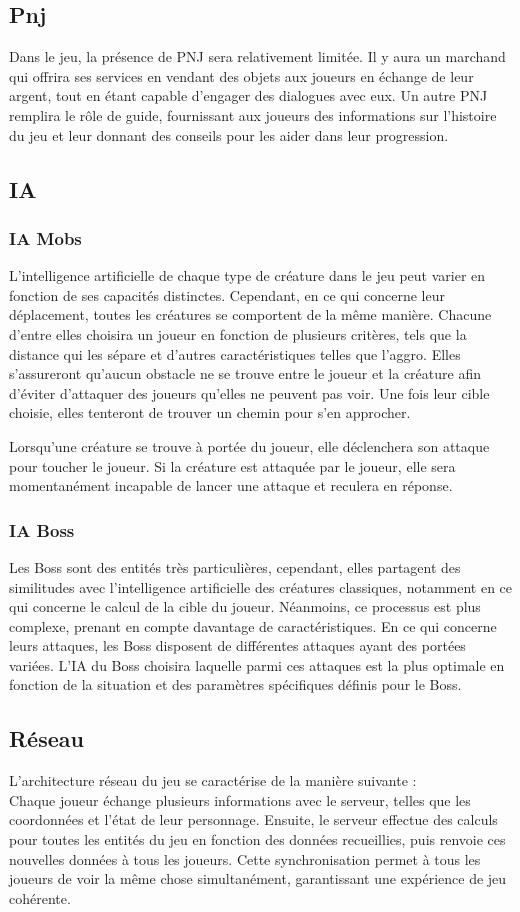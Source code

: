 \documentclass{article}
\begin{document}
\subsection{Pnj}
Dans le jeu, la présence de PNJ sera relativement limitée. Il y aura un marchand qui offrira ses services en vendant des objets aux joueurs en échange de leur argent, tout en étant capable d'engager des dialogues avec eux. Un autre PNJ remplira le rôle de guide, fournissant aux joueurs des informations sur l'histoire du jeu et leur donnant des conseils pour les aider dans leur progression.
\subsection{IA}
\subsubsection{IA Mobs}
L'intelligence artificielle de chaque type de créature dans le jeu peut varier en fonction de ses capacités distinctes. Cependant, en ce qui concerne leur déplacement, toutes les créatures se comportent de la même manière. Chacune d'entre elles choisira un joueur en fonction de plusieurs critères, tels que la distance qui les sépare et d'autres caractéristiques telles que l'aggro. Elles s'assureront qu'aucun obstacle ne se trouve entre le joueur et la créature afin d'éviter d'attaquer des joueurs qu'elles ne peuvent pas voir. Une fois leur cible choisie, elles tenteront de trouver un chemin pour s'en approcher.

Lorsqu'une créature se trouve à portée du joueur, elle déclenchera son attaque pour toucher le joueur. Si la créature est attaquée par le joueur, elle sera momentanément incapable de lancer une attaque et reculera en réponse.
\subsubsection{IA Boss}
Les Boss sont des entités très particulières, cependant, elles partagent des similitudes avec l'intelligence artificielle des créatures classiques, notamment en ce qui concerne le calcul de la cible du joueur. Néanmoins, ce processus est plus complexe, prenant en compte davantage de caractéristiques. En ce qui concerne leurs attaques, les Boss disposent de différentes attaques ayant des portées variées. L'IA du Boss choisira laquelle parmi ces attaques est la plus optimale en fonction de la situation et des paramètres spécifiques définis pour le Boss.
\subsection{Réseau}
L'architecture réseau du jeu se caractérise de la manière suivante : \\
Chaque joueur échange plusieurs informations avec le serveur, telles que les coordonnées et l'état de leur personnage. Ensuite, le serveur effectue des calculs pour toutes les entités du jeu en fonction des données recueillies, puis renvoie ces nouvelles données à tous les joueurs. Cette synchronisation permet à tous les joueurs de voir la même chose simultanément, garantissant une expérience de jeu cohérente.\\
\end{document}
